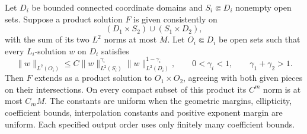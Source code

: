 \begin{lemma}\label{cross:series}
Let $D_i$ be bounded connected coordinate domains and
$S_i\Subset D_i$ nonempty open sets.  Suppose a product solution $F$ is
given consistently on
\[
 (D_1\times S_2)\cup(S_1\times D_2),
\]
with the sum of its two $L^2$ norms at most $M$.
Let $O_i\Subset D_i$ be open sets such that every $L_i$-solution $w$
on $D_i$ satisfies
\begin{equation}\label{cross:interpolation-input}
 \|w\|_{L^2(O_i)}
 \le C\|w\|_{L^2(S_i)}^{\gamma_i}
          \|w\|_{L^2(D_i)}^{1-\gamma_i},
 \qquad 0<\gamma_i<1,\qquad \gamma_1+\gamma_2>1.
\end{equation}
Then $F$ extends as a product solution to $O_1\times O_2$, agreeing
with both given pieces on their intersections.  On every compact
subset of this product its $C^m$ norm is at most $C_mM$.
The constants are uniform when the geometric margins, ellipticity,
coefficient bounds, interpolation constants and positive exponent
margin are uniform.  Each specified output order uses only finitely
many coefficient bounds.
\end{lemma}

